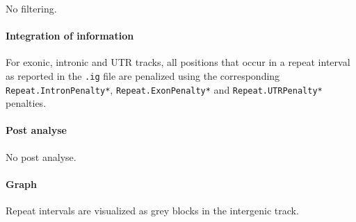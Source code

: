 No filtering.

\paragraph{Integration of information}

For exonic, intronic and UTR tracks, all positions that occur in a
repeat interval as reported in the \texttt{.ig} file are penalized
using the corresponding \texttt{Repeat.IntronPenalty*},
\texttt{Repeat.ExonPenalty*} and \texttt{Repeat.UTRPenalty*} penalties.

\paragraph{Post analyse}

No post analyse.

\paragraph{Graph}

Repeat intervals are visualized as grey blocks in the intergenic
track.




